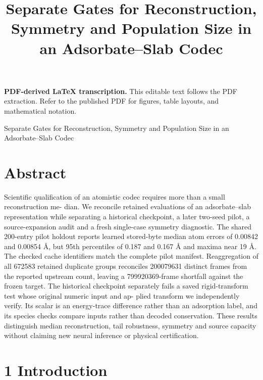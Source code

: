 \documentclass[11pt]{article}
\title{Separate Gates for Reconstruction, Symmetry and Population Size in an Adsorbate–Slab Codec}
\author{}
\date{}
\begin{document}
\maketitle
\noindent\textbf{PDF-derived LaTeX transcription.} This editable text follows the PDF extraction. Refer to the published PDF for figures, table layouts, and mathematical notation.


Separate Gates for Reconstruction, Symmetry and Population Size
in an Adsorbate–Slab Codec

\section*{Abstract}

Scientific qualification of an atomistic codec requires more than a small reconstruction me-
dian. We reconcile retained evaluations of an adsorbate–slab representation while separating
a historical checkpoint, a later two-seed pilot, a source-expansion audit and a fresh single-case
symmetry diagnostic. The shared 200-entry pilot holdout reports learned stored-byte median
atom errors of 0.00842 and 0.00854 Å, but 95th percentiles of 0.187 and 0.167 Å and maxima
near 19 Å. The checked cache identifiers match the complete pilot manifest. Reaggregation of
all 672583 retained duplicate groups reconciles 200079631 distinct frames from the reported
upstream count, leaving a 799920369-frame shortfall against the frozen target. The historical
checkpoint separately fails a saved rigid-transform test whose original numeric input and ap-
plied transform we independently verify. Its scalar is an energy-trace difference rather than
an adsorption label, and its species checks compare inputs rather than decoded conservation.
These results distinguish median reconstruction, tail robustness, symmetry and source capacity
without claiming new neural inference or physical certification.

\section*{1 Introduction}
\end{document}
